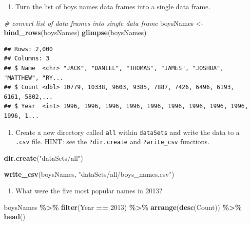 \documentclass[
]{book}
\newenvironment{Shaded}{\begin{snugshade}}{\end{snugshade}}
\newcommand{\CommentTok}[1]{\textcolor[rgb]{0.56,0.35,0.01}{\textit{#1}}}
\newcommand{\DecValTok}[1]{\textcolor[rgb]{0.00,0.00,0.81}{#1}}
\newcommand{\KeywordTok}[1]{\textcolor[rgb]{0.13,0.29,0.53}{\textbf{#1}}}
\newcommand{\NormalTok}[1]{#1}
\newcommand{\OperatorTok}[1]{\textcolor[rgb]{0.81,0.36,0.00}{\textbf{#1}}}
\newcommand{\StringTok}[1]{\textcolor[rgb]{0.31,0.60,0.02}{#1}}
\providecommand{\tightlist}{%
  \setlength{\itemsep}{0pt}\setlength{\parskip}{0pt}}
\begin{document}
\begin{alert}

\begin{enumerate}
\def\labelenumi{\arabic{enumi}.}
\tightlist
\item
  Turn the list of boys names data frames into a single data frame.
\end{enumerate}

\begin{Shaded}
\begin{Highlighting}[]
\CommentTok{\# convert list of data frames into single data frame}
\NormalTok{boysNames \textless{}{-}}\StringTok{ }\KeywordTok{bind\_rows}\NormalTok{(boysNames)}
\KeywordTok{glimpse}\NormalTok{(boysNames)}
\end{Highlighting}
\end{Shaded}

\begin{verbatim}
## Rows: 2,000
## Columns: 3
## $ Name  <chr> "JACK", "DANIEL", "THOMAS", "JAMES", "JOSHUA", "MATTHEW", "RY...
## $ Count <dbl> 10779, 10338, 9603, 9385, 7887, 7426, 6496, 6193, 6161, 5802,...
## $ Year  <int> 1996, 1996, 1996, 1996, 1996, 1996, 1996, 1996, 1996, 1996, 1...
\end{verbatim}

\begin{enumerate}
\def\labelenumi{\arabic{enumi}.}
\setcounter{enumi}{1}
\tightlist
\item
  Create a new directory called \texttt{all} within \texttt{dataSets} and write the data to a \texttt{.csv} file. HINT: see the \texttt{?dir.create} and \texttt{?write\_csv} functions.
\end{enumerate}

\begin{Shaded}
\begin{Highlighting}[]
\KeywordTok{dir.create}\NormalTok{(}\StringTok{"dataSets/all"}\NormalTok{)}

\KeywordTok{write\_csv}\NormalTok{(boysNames, }\StringTok{"dataSets/all/boys\_names.csv"}\NormalTok{)}
\end{Highlighting}
\end{Shaded}

\begin{enumerate}
\def\labelenumi{\arabic{enumi}.}
\setcounter{enumi}{2}
\tightlist
\item
  What were the five most popular names in 2013?
\end{enumerate}

\begin{Shaded}
\begin{Highlighting}[]
\NormalTok{boysNames }\OperatorTok{\%\textgreater{}\%}\StringTok{ }
\StringTok{  }\KeywordTok{filter}\NormalTok{(Year }\OperatorTok{==}\StringTok{ }\DecValTok{2013}\NormalTok{) }\OperatorTok{\%\textgreater{}\%}
\StringTok{  }\KeywordTok{arrange}\NormalTok{(}\KeywordTok{desc}\NormalTok{(Count)) }\OperatorTok{\%\textgreater{}\%}
\StringTok{  }\KeywordTok{head}\NormalTok{()}
\end{Highlighting}
\end{Shaded}


\end{alert}
\end{document}
